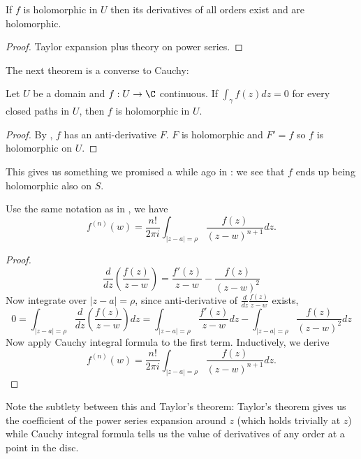 \documentclass[a4paper]{article}
\begin{document}
\begin{corollary}
  If \(f\) is holomorphic in \(U\) then its derivatives of all orders exist and are holomorphic.
\end{corollary}

\begin{proof}
  Taylor expansion plus theory on power series.
\end{proof}

The next theorem is a converse to Cauchy:

\begin{corollary}[Morera]
  Let \(U\) be a domain and \(f: U \to \C\) continuous. If \(\int_\gamma f(z) dz = 0\) for every closed paths in \(U\), then \(f\) is holomorphic in \(U\).
\end{corollary}

\begin{proof}
  By , \(f\) has an anti-derivative \(F\). \(F\) is holomorphic and \(F' = f\) so \(f\) is holomorphic on \(U\).
\end{proof}

This gives us something we promised a while ago in : we see that \(f\) ends up being holomorphic also on \(S\).

\begin{proposition}
  Use the same notation as in , we have
  \[
    f^{(n)}(w) = \frac{n!}{2\pi i} \int_{|z - a| = \rho} \frac{f(z)}{(z - w)^{n + 1}} dz.
  \]
\end{proposition}

\begin{proof}
\[
  \frac{d}{dz} \left( \frac{f(z)}{z - w} \right)
  = \frac{f'(z)}{z - w} - \frac{f(z)}{(z - w)^2}
\]
Now integrate over \(|z - a| = \rho\), since anti-derivative of \(\frac{d}{dz} \frac{f(z)}{z - w}\) exists,
\[
  0 = \int_{|z - a| = \rho}  \frac{d}{dz} \left( \frac{f(z)}{z - w} \right)dz
  = \int_{|z - a| = \rho} \frac{f'(z)}{z - w} dz - \int_{|z - a| = \rho} \frac{f(z)}{(z - w)^2} dz
\]
Now apply Cauchy integral formula to the first term. Inductively, we derive
\[
  f^{(n)}(w) = \frac{n!}{2\pi i} \int_{|z - a| = \rho} \frac{f(z)}{(z - w)^{n + 1}} dz.
\]
\end{proof}

Note the subtlety between this and Taylor's theorem: Taylor's theorem gives us the coefficient of the power series expansion around \(z\) (which holds trivially at \(z\)) while Cauchy integral formula tells us the value of derivatives of any order at a point in the disc.
\end{document}
